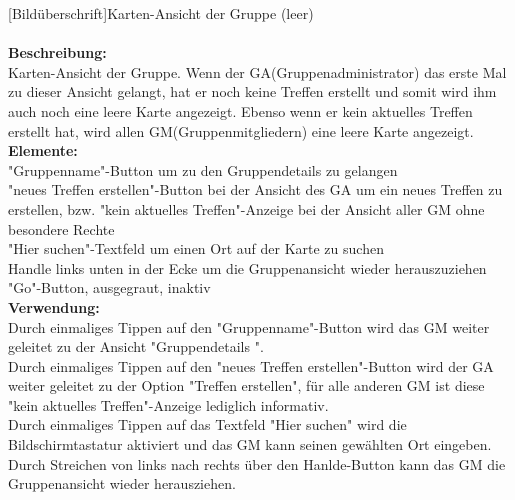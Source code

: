 [Bildüberschrift]Karten-Ansicht der Gruppe (leer)\\ \\
\textbf{Beschreibung:}\\
Karten-Ansicht der Gruppe. Wenn der GA(Gruppenadministrator) das erste Mal zu dieser Ansicht gelangt, hat er noch keine Treffen erstellt und somit wird ihm auch noch eine leere Karte angezeigt. Ebenso wenn er kein aktuelles Treffen erstellt hat, wird allen GM(Gruppenmitgliedern) eine leere Karte angezeigt.\\
\textbf{Elemente:}\\
"Gruppenname"-Button um zu den Gruppendetails zu gelangen\\
"neues Treffen erstellen"-Button bei der Ansicht des GA um ein neues Treffen zu erstellen, bzw. "kein aktuelles Treffen"-Anzeige bei der Ansicht aller GM ohne besondere Rechte\\
"Hier suchen"-Textfeld um einen Ort auf der Karte zu suchen\\
Handle links unten in der Ecke um die Gruppenansicht wieder herauszuziehen\\
"Go"-Button, ausgegraut, inaktiv\\
\textbf{Verwendung:}\\
Durch einmaliges Tippen auf den "Gruppenname"-Button wird das GM weiter geleitet zu der Ansicht "Gruppendetails ".\\
Durch einmaliges Tippen auf den "neues Treffen erstellen"-Button wird der GA weiter geleitet zu der Option "Treffen erstellen", für alle anderen GM ist diese "kein aktuelles Treffen"-Anzeige lediglich informativ.\\
Durch einmaliges Tippen auf das Textfeld "Hier suchen" wird die Bildschirmtastatur aktiviert und das GM kann seinen gewählten Ort eingeben.\\
Durch Streichen von links nach rechts über den Hanlde-Button kann das GM die Gruppenansicht wieder herausziehen.
\newpage

